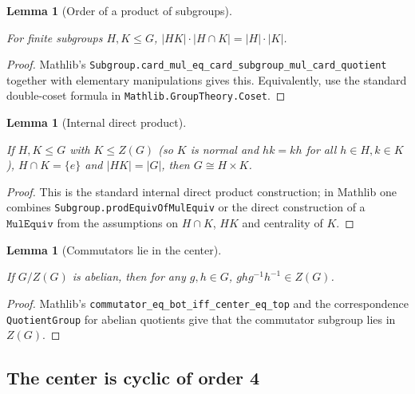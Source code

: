 \documentclass{article}
\newtheorem{lemma}[theorem]{Lemma}
\theoremstyle{definition}
\newcommand{\lean}[1]{}
\newcommand{\leanok}{}
\newcommand{\leanfile}[1]{}
\begin{document}
\begin{lemma}[Order of a product of subgroups]
    \label{lem:subgroup-product-card}
    \lean{OrderSixteen.Prelim.subgroup_product_card}
    \leanfile{M2rGroup7/SixteenCase.lean}
    \leanok
    For finite subgroups $H, K \le G$, $|HK| \cdot |H \cap K| = |H| \cdot
    |K|$.
\end{lemma}
\begin{proof}
    Mathlib's \texttt{Subgroup.card\_mul\_eq\_card\_subgroup\_mul\_card\_quotient}
    together with elementary manipulations gives this. Equivalently, use the
    standard double-coset formula in \texttt{Mathlib.GroupTheory.Coset}.
\end{proof}

\begin{lemma}[Internal direct product]
    \label{lem:internal-direct-product}
    \lean{OrderSixteen.Prelim.internal_direct_product}
    \leanfile{M2rGroup7/SixteenCase.lean}
    \leanok
    If $H, K \le G$ with $K \le Z(G)$ (so $K$ is normal and $hk = kh$ for all
    $h \in H, k \in K$), $H \cap K = \{e\}$ and $|HK| = |G|$, then
    $G \cong H \times K$.
\end{lemma}
\begin{proof}
    This is the standard internal direct product construction; in Mathlib
    one combines \texttt{Subgroup.prodEquivOfMulEquiv} or the direct
    construction of a $\texttt{MulEquiv}$ from the assumptions on $H \cap K$,
    $HK$ and centrality of $K$.
\end{proof}

\begin{lemma}[Commutators lie in the center]
    \label{lem:commutator-in-center-when-quotient-abelian}
    \lean{OrderSixteen.Prelim.commutator_in_center_when_quotient_abelian}
    \leanfile{M2rGroup7/SixteenCase.lean}
    \leanok
    If $G/Z(G)$ is abelian, then for any $g, h \in G$, $g h g^{-1} h^{-1} \in
    Z(G)$.
\end{lemma}
\begin{proof}
    Mathlib's \texttt{commutator\_eq\_bot\_iff\_center\_eq\_top} and the
    correspondence \texttt{QuotientGroup} for abelian quotients give that
    the commutator subgroup lies in $Z(G)$.
\end{proof}

\subsection{The center is cyclic of order 4}
\end{document}
